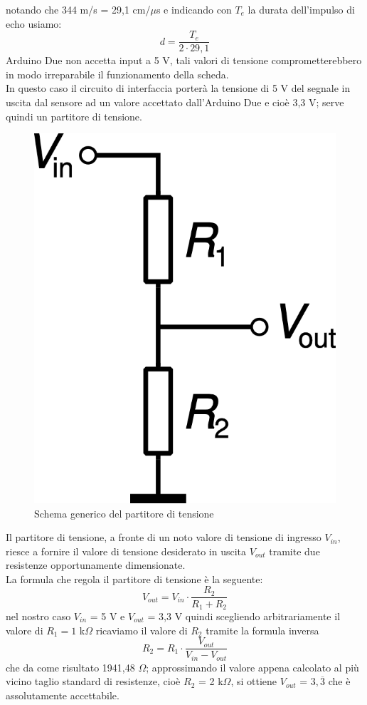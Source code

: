 notando che 344 m/s = 29,1 cm/$\mu$s e indicando con $T_e$ la durata dell'impulso 
di echo usiamo:
$$d=\frac{T_e}{2\cdot29,1}$$
Arduino Due non accetta input a 5 V, tali valori di tensione comprometterebbero in modo 
irreparabile il funzionamento della scheda.\\ 
In questo caso il circuito di interfaccia porterà la tensione di 5 V del segnale in uscita 
dal sensore ad un valore accettato dall'Arduino Due e cioè 3,3 V; serve quindi un 
partitore di tensione.
\begin{figure}[!htb] \center
\includegraphics[scale=0.6]{immagini/Voltage_divider.png}
\caption{Schema generico del partitore di tensione} 
\end{figure}

Il partitore di tensione, a fronte di un noto valore di tensione di ingresso 
$V_{in}$, riesce a fornire il valore di tensione desiderato in uscita $V_{out}$ 
tramite due resistenze opportunamente dimensionate. \\
La formula che regola il partitore di tensione è la seguente:
$$V_{out}=V_{in}\cdot\frac{R_2}{R_1+R_2}$$
nel nostro caso $V_{in}$ = 5 V e $V_{out}$ = 3,3 V quindi scegliendo arbitrariamente 
il valore di $R_1=1$ k$\Omega$ ricaviamo il valore di $R_2$ tramite 
la formula inversa $$R_2 = R_1\cdot\frac{V_{out}}{V_{in}-V_{out}}$$
che da come risultato 1941,48 $\Omega$; approssimando il valore appena calcolato
al più vicino taglio standard di resistenze, cioè $R_2 $ = 2 k$\Omega$, si 
ottiene $V_{out}$
 = $3,\overline{3}$ che è assolutamente accettabile.

